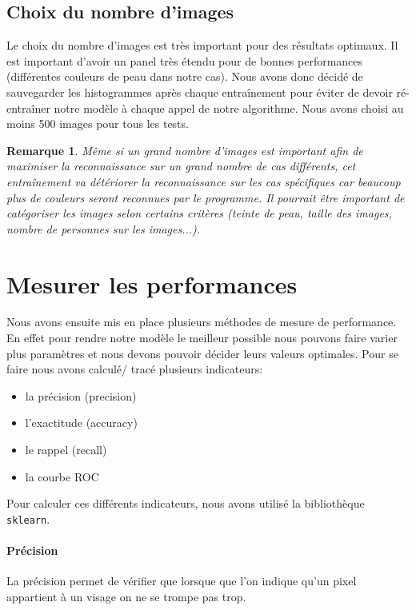 \documentclass[a4paper,12pt, openany]{book}
\theoremstyle{break}
\newtheorem{remarque}{Remarque}[section]
\begin{document}
\subsection{Choix du nombre d'images}

Le choix du nombre d'images est très important pour des résultats optimaux. Il est important d'avoir un panel très étendu pour de bonnes performances (différentes couleurs de peau dans notre cas). Nous avons donc décidé de sauvegarder les histogrammes après chaque entraînement pour éviter de devoir ré-entraîner notre modèle à chaque appel de notre algorithme.
Nous avons choisi au moins 500 images pour tous les tests.

\begin{remarque}
  Même si un grand nombre d'images est important afin de maximiser la reconnaissance sur un grand nombre de cas différents, cet entraînement va détériorer la reconnaissance sur les cas spécifiques car beaucoup plus de couleurs seront reconnues par le programme.
  Il pourrait être important de catégoriser les images selon certains critères (teinte de peau, taille des images, nombre de personnes sur les images...).
\end{remarque}

\section{Mesurer les performances}
Nous avons ensuite mis en place plusieurs méthodes de mesure de performance. En effet pour rendre notre modèle le meilleur possible nous pouvons faire varier plus paramètres et nous devons pouvoir décider leurs valeurs optimales.
Pour se faire nous avons calculé/ tracé plusieurs indicateurs:

\begin{itemize}
  \item la précision (precision)
  \item l'exactitude (accuracy)
  \item le rappel (recall)
  \item la courbe ROC
\end{itemize}


Pour calculer ces différents indicateurs, nous avons utilisé la bibliothèque \texttt{sklearn}.

\paragraph{Précision}
La précision permet de vérifier que lorsque que l'on indique qu'un pixel appartient à un visage on ne se trompe pas trop.
\end{document}
